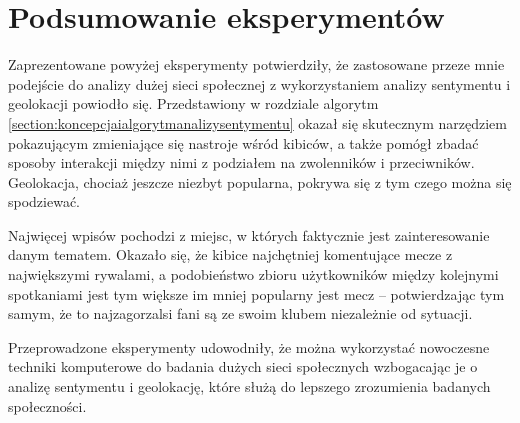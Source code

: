 \section{Podsumowanie eksperymentów}
Zaprezentowane powyżej eksperymenty potwierdziły, że zastosowane przeze mnie
podejście do analizy dużej sieci społecznej z wykorzystaniem analizy sentymentu
i geolokacji powiodło się. Przedstawiony w rozdziale algorytm
\ref{section:koncepcjaialgorytmanalizysentymentu} okazał się skutecznym
narzędziem pokazującym zmieniające się nastroje wśród kibiców, a także pomógł
zbadać sposoby interakcji między nimi z podziałem na zwolenników i przeciwników.
Geolokacja, chociaż jeszcze niezbyt popularna, pokrywa się z tym czego można
się spodziewać.

Najwięcej wpisów pochodzi z miejsc, w których faktycznie jest zainteresowanie
danym tematem. Okazało się, że kibice najchętniej komentujące mecze z
największymi rywalami, a podobieństwo zbioru użytkowników między kolejnymi
spotkaniami jest tym większe im mniej popularny jest mecz -- potwierdzając tym
samym, że to najzagorzalsi fani są ze swoim klubem niezależnie od sytuacji.

Przeprowadzone eksperymenty udowodniły, że można wykorzystać nowoczesne techniki
komputerowe do badania dużych sieci społecznych wzbogacając je o analizę
sentymentu i geolokację, które służą do lepszego zrozumienia badanych
społeczności.


